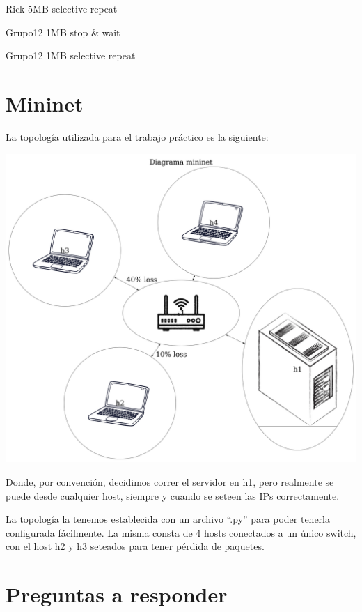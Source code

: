 \documentclass{article}
\begin{document}
Rick 5MB selective repeat

Grupo12 1MB stop \& wait

Grupo12 1MB selective repeat

\section{\texorpdfstring{\textbf{Mininet}}{Mininet}}\label{mininet}

La topología utilizada para el trabajo práctico es la siguiente:

\begin{center}
\includegraphics[scale=0.09999999999]{diagramaMininet}
\end{center}

Donde, por convención, decidimos correr el servidor en h1, pero
realmente se puede desde cualquier host, siempre y cuando se seteen las
IPs correctamente.

La topología la tenemos establecida con un archivo ``.py'' para poder
tenerla configurada fácilmente. La misma consta de 4 hosts conectados a
un único switch, con el host h2 y h3 seteados para tener pérdida de
paquetes.

\section{\texorpdfstring{\textbf{Preguntas a responder}}{Preguntas a responder}}\label{preguntas-a-responder}
\end{document}
